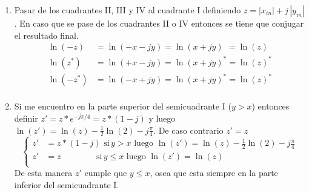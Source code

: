 \documentclass[10pt,a4paper]{book}
\begin{document}
   \begin{enumerate}
      \item{Pasar de los cuadrantes II, III y IV al cuadrante I definiendo $z = |x_{in}| + j \, |y_{in}|$. En caso que se pase de los cuadrantes II o IV entonces se tiene que conjugar el resultado final.
   \begin{equation} \label{eq:log_z_prop}
      \begin{aligned}
         \ln(-z)        &=\ln(-x -j y)  = \ln( x+ j y)    \ \,  =\ln(z)        \\
         \ln( z^\ast)   &=\ln(+x -j y)  = {\ln( x+ j y)}^{\ast} =\ln(z)^\ast   \\
         \ln(-z^\ast)   &=\ln(-x +j y)  = {\ln( x+ j y)}^{\ast} =\ln(z)^\ast   \\
      \end{aligned}
   \end{equation}
      }
   \item{Si me encuentro en la parte superior del semicuadrante I ($y>x$) entonces definir $z'=z*e^{-j\pi / 4}=z*(1-j)$ y luego $\ln(z')=\ln(z)-\frac{1}{2}\ln(2)-j\frac{\pi}{4}$. De caso contrario $z'=z$
         \begin{equation} \label{eq:L_range_ext_2}
            \left\{
               \begin{aligned}
                  z' &= z*(1-j) \,\,                  \text{si}\, y   >  x    \,\,\text{luego}\,\, \ln(z')=\ln(z)-\frac{1}{2}\ln(2)-j\frac{\pi}{4}\\
                  z' &= z       \quad\quad\quad\quad\,\text{si}\, y \leq x    \,\,\text{luego}\,\, \ln(z')=\ln(z)                                 \\
               \end{aligned}
            \right.
         \end{equation}
      De esta manera $z'$ cumple que $y \leq x$, osea que esta siempre en la parte inferior del semicuadrante I.
      }


\end{enumerate}
\end{document}
